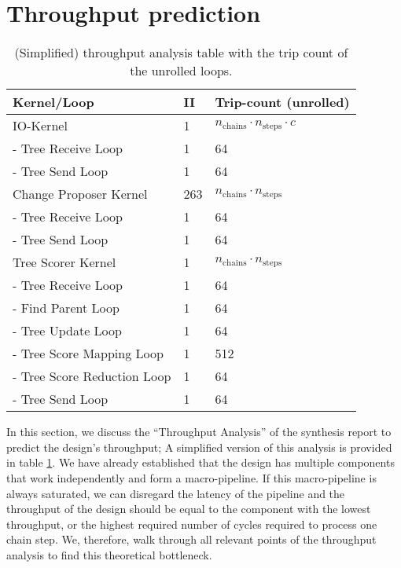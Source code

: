 \section{Throughput prediction}

\begin{table}
    \centering
    \begin{tabular}{l|l|l}
        \textbf{Kernel/Loop} & \textbf{\acs{II}} & \textbf{Trip-count (unrolled)} \\
        \hline
        IO-Kernel & 1 & $n_\mathrm{chains} \cdot n_\mathrm{steps} \cdot c$ \\
        - Tree Receive Loop & 1 & 64 \\
        - Tree Send Loop & 1 & 64 \\
        \hline
        Change Proposer Kernel & 263 & $n_\mathrm{chains} \cdot n_\mathrm{steps}$ \\
        - Tree Receive Loop & 1 & 64 \\
        - Tree Send Loop & 1 & 64 \\
        \hline
        Tree Scorer Kernel & 1 & $n_\mathrm{chains} \cdot n_\mathrm{steps}$ \\
        - Tree Receive Loop & 1 & 64 \\
        - Find Parent Loop & 1 & 64 \\
        - Tree Update Loop & 1 & 64 \\
        - Tree Score Mapping Loop & 1 & 512 \\
        - Tree Score Reduction Loop & 1 & 64 \\
        - Tree Send Loop & 1 & 64 \\
    \end{tabular}
    \caption{(Simplified) throughput analysis table with the trip count of the unrolled loops.}
    \label{tab:throughput}
\end{table}

In this section, we discuss the ``Throughput Analysis'' of the synthesis report to predict the design's throughput; A simplified version of this analysis is provided in table \ref{tab:throughput}. We have already established that the design has multiple components that work independently and form a macro-pipeline. If this macro-pipeline is always saturated, we can disregard the latency of the pipeline and the throughput of the design should be equal to the component with the lowest throughput, or the highest required number of cycles required to process one chain step. We, therefore, walk through all relevant points of the throughput analysis to find this theoretical bottleneck.

